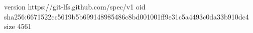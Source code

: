 version https://git-lfs.github.com/spec/v1
oid sha256:6671522cc5619b5b699148985486c8bd001001ff9e31c5a4493c0da33b910dc4
size 4561
